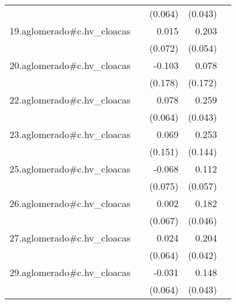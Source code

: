 {\begin{longtable}{l*{4}{D{.}{.}{-1}}}
            &                     &     (0.064)         &     (0.043)         &                     \\
\addlinespace
19.aglomerado#c.hv\_cloacas&                     &       0.015         &       0.203\sym{***}&                     \\
            &                     &     (0.072)         &     (0.054)         &                     \\
\addlinespace
20.aglomerado#c.hv\_cloacas&                     &      -0.103         &       0.078         &                     \\
            &                     &     (0.178)         &     (0.172)         &                     \\
\addlinespace
22.aglomerado#c.hv\_cloacas&                     &       0.078         &       0.259\sym{***}&                     \\
            &                     &     (0.064)         &     (0.043)         &                     \\
\addlinespace
23.aglomerado#c.hv\_cloacas&                     &       0.069         &       0.253         &                     \\
            &                     &     (0.151)         &     (0.144)         &                     \\
\addlinespace
25.aglomerado#c.hv\_cloacas&                     &      -0.068         &       0.112         &                     \\
            &                     &     (0.075)         &     (0.057)         &                     \\
\addlinespace
26.aglomerado#c.hv\_cloacas&                     &       0.002         &       0.182\sym{***}&                     \\
            &                     &     (0.067)         &     (0.046)         &                     \\
\addlinespace
27.aglomerado#c.hv\_cloacas&                     &       0.024         &       0.204\sym{***}&                     \\
            &                     &     (0.064)         &     (0.042)         &                     \\
\addlinespace
29.aglomerado#c.hv\_cloacas&                     &      -0.031         &       0.148\sym{***}&                     \\
            &                     &     (0.064)         &     (0.043)         &                     \\

\end{longtable}}
